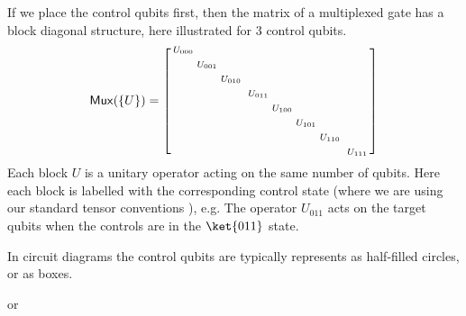If we place the control qubits first, then the matrix of a multiplexed gate has a block diagonal structure, here illustrated for 3 control qubits.
\[
{\sf{Mux}}(\{U\}) = 
\begin{bsmallmatrix}
    U_{000} \\[1ex]
    & U_{001} \\[1ex]
    && U_{010} \\[1ex]
    &&&& U_{011}  \\[1ex]
    &&&&& U_{100} \\[1ex]
    &&&&&& U_{101} \\[1ex]
    &&&&&&& U_{110} \\[1ex]
    &&&&&&&&& U_{111}     
\end{bsmallmatrix}
\]
Each block $U$ is a unitary operator acting on the same number of qubits. Here each block is labelled with the corresponding control state (where we are using our standard tensor conventions ), e.g. The operator $U_{011}$ acts on the target qubits when the controls are in the $\ket{011}$ state.



In circuit diagrams the control qubits are typically represents as half-filled circles, or as boxes. 
\begin{center}
or
\end{center}

